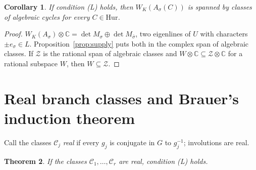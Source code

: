 \documentclass[11pt]{amsart}
\newtheorem{theorem}{Theorem}[section]
\newtheorem{corollary}[theorem]{Corollary}
\theoremstyle{definition}
\theoremstyle{remark}
\newcommand{\C}{\mathbb C}
\newcommand{\cH}{\mathrm{Hur}}
\begin{document}
\begin{corollary}\label{cor:everymember}
If condition (L) holds, then $W_K(A_\sigma(C))$ is spanned by classes of algebraic cycles for every $C\in\cH$.
\end{corollary}

\begin{proof}
$W_K(A_\sigma)\otimes\C=\det M_\sigma\oplus\det M_{\bar\sigma}$, two eigenlines of $U$ with characters $\pm e_\sigma\in L$. Proposition~\ref{prop:supply} puts both in the complex span of algebraic classes. If $\mathcal Z$ is the rational span of algebraic classes and $W\otimes\C\subseteq\mathcal Z\otimes\C$ for a rational subspace $W$, then $W\subseteq\mathcal Z$.
\end{proof}


\section{Real branch classes and Brauer's induction theorem}\label{sec:brauer}

Call the classes $\mathcal C_j$ \emph{real} if every $g_j$ is conjugate in $G$ to $g_j^{-1}$; involutions are real.

\begin{theorem}\label{thm:brauer}
If the classes $\mathcal C_1,\dots,\mathcal C_r$ are real, condition (L) holds.
\end{theorem}
\end{document}
